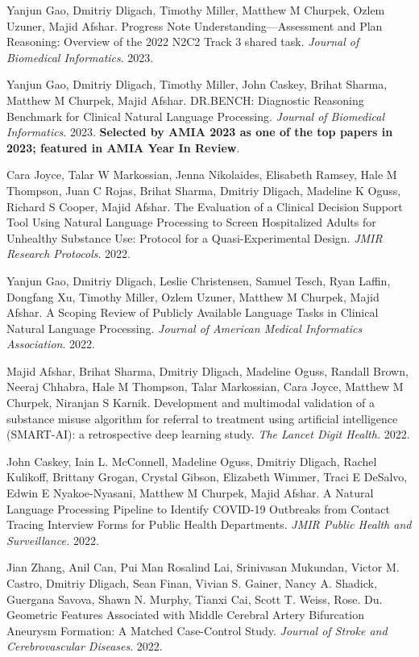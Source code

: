\documentclass[letterpaper]{article}
\renewenvironment{itemize}{
  \begin{list}{}{
    \setlength{\leftmargin}{1.5em}
  }
}{
  \end{list}
}
\begin{document}
\begin{itemize}
\item Yanjun Gao, Dmitriy Dligach, Timothy Miller, Matthew M Churpek, Ozlem Uzuner, Majid Afshar. Progress Note Understanding—Assessment and Plan Reasoning: Overview of the 2022 N2C2 Track 3 shared task. \emph{Journal of Biomedical Informatics}. 2023.
\item Yanjun Gao, Dmitriy Dligach, Timothy Miller, John Caskey, Brihat Sharma, Matthew M Churpek, Majid Afshar. DR.BENCH: Diagnostic Reasoning Benchmark for Clinical Natural Language Processing. \emph{Journal of Biomedical Informatics}. 2023. \textbf{Selected by AMIA 2023 as one of the top papers in 2023; featured in AMIA Year In Review}.
\item Cara Joyce, Talar W Markossian, Jenna Nikolaides, Elisabeth Ramsey, Hale M Thompson, Juan C Rojas, Brihat Sharma, Dmitriy Dligach, Madeline K Oguss, Richard S Cooper, Majid Afshar. The Evaluation of a Clinical Decision Support Tool Using Natural Language Processing to Screen Hospitalized Adults for Unhealthy Substance Use: Protocol for a Quasi-Experimental Design. \emph{JMIR Research Protocols}. 2022.
\item Yanjun Gao, Dmitriy Dligach, Leslie Christensen, Samuel Tesch, Ryan Laffin, Dongfang Xu, Timothy Miller, Ozlem Uzuner, Matthew M Churpek, Majid Afshar. A Scoping Review of Publicly Available Language Tasks in Clinical Natural Language Processing. \emph{Journal of American Medical Informatics Association}. 2022.
\item Majid Afshar, Brihat Sharma, Dmitriy Dligach, Madeline Oguss, Randall Brown, Neeraj Chhabra, Hale M Thompson, Talar Markossian, Cara Joyce, Matthew M Churpek, Niranjan S Karnik. Development and multimodal validation of a substance misuse algorithm for referral to treatment using artificial intelligence (SMART-AI): a retrospective deep learning study. \emph{The Lancet Digit Health.} 2022.
\item John Caskey, Iain L. McConnell, Madeline Oguss, Dmitriy Dligach, Rachel Kulikoff, Brittany Grogan, Crystal Gibson, Elizabeth Wimmer, Traci E DeSalvo, Edwin E Nyakoe-Nyasani, Matthew M Churpek, Majid Afshar. A Natural Language Processing Pipeline to Identify COVID-19 Outbreaks from Contact Tracing Interview Forms for Public Health Departments. \emph{JMIR Public Health and Surveillance.} 2022.
\item Jian Zhang, Anil Can, Pui Man Rosalind Lai, Srinivasan Mukundan, Victor M. Castro, Dmitriy Dligach, Sean Finan, Vivian S. Gainer, Nancy A. Shadick, Guergana Savova, Shawn N. Murphy, Tianxi Cai, Scott T. Weiss, Rose. Du. Geometric Features Associated with Middle Cerebral Artery Bifurcation Aneurysm Formation: A Matched Case-Control Study. \emph{Journal of Stroke and Cerebrovascular Diseases}. 2022.

\end{itemize}
\end{document}
